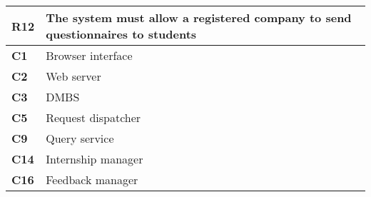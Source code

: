 \begin{table}[H]
    \centering
    \begin{tabular}{|l|m{10cm}|}
        \hline \textbf{R12} & The system must allow a registered company to send questionnaires to students \\
        \hline \textbf{C1} & Browser interface \\
        \hline \textbf{C2} & Web server \\
        \hline \textbf{C3} & DMBS \\
        \hline \textbf{C5} & Request dispatcher \\
        \hline \textbf{C9} & Query service \\
        \hline \textbf{C14} & Internship manager \\
        \hline \textbf{C16} & Feedback manager \\
        \hline
    \end{tabular}
\end{table}

